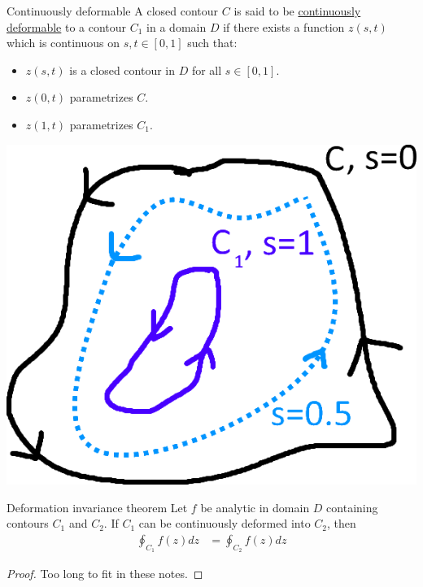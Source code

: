 \documentclass[12pt]{article}
\begin{document}
	\begin{mydef}{Continuously deformable}{}
		A closed contour $C$ is said to be \underline{continuously deformable} to a contour $C_1$ in a domain $D$ if there exists a function $z(s, t)$ which is continuous on $s, t\in[0, 1]$ such that:
		\begin{itemize}
			\item $z(s, t)$ is a closed contour in $D$ for all $s\in[0, 1]$.
			\item $z(0, t)$ parametrizes $C$.
			\item $z(1, t)$ parametrizes $C_1$.
		\end{itemize}
	\end{mydef}
	
	\begin{myex}{}{}
		\includegraphics[scale=1]{Notes1.png}
	\end{myex}
	
	\begin{mythm}{Deformation invariance theorem}{}
		Let $f$ be analytic in domain $D$ containing contours $C_1$ and $C_2$. If $C_1$ can be continuously deformed into $C_2$, then
		\begin{align*}
			\oint_{C_1}f(z)dz&=\oint_{C_2}f(z)dz
		\end{align*}
		\begin{proof}
			Too long to fit in these notes.
		\end{proof}
	\end{mythm}
	
\end{document}
